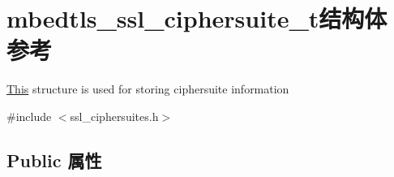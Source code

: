 \hypertarget{structmbedtls__ssl__ciphersuite__t}{}\section{mbedtls\+\_\+ssl\+\_\+ciphersuite\+\_\+t结构体 参考}
\label{structmbedtls__ssl__ciphersuite__t}


\hyperlink{namespace_this}{This} structure is used for storing ciphersuite information  




{\ttfamily \#include $<$ssl\+\_\+ciphersuites.\+h$>$}

\subsection*{Public 属性}
